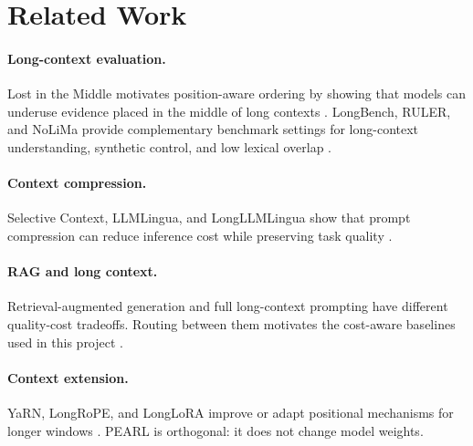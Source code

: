 \section{Related Work}

\paragraph{Long-context evaluation.}
Lost in the Middle motivates position-aware ordering by showing that models can
underuse evidence placed in the middle of long contexts \cite{liu2023lost}.
LongBench, RULER, and NoLiMa provide complementary benchmark settings for
long-context understanding, synthetic control, and low lexical overlap
\cite{bai2023longbench,hsieh2024ruler,modarressi2025nolima}.

\paragraph{Context compression.}
Selective Context, LLMLingua, and LongLLMLingua show that prompt compression can
reduce inference cost while preserving task quality
\cite{li2023selective,jiang2023llmlingua,jiang2024longllmlingua}.

\paragraph{RAG and long context.}
Retrieval-augmented generation and full long-context prompting have different
quality-cost tradeoffs. Routing between them motivates the cost-aware baselines
used in this project \cite{li2024raglongcontext}.

\paragraph{Context extension.}
YaRN, LongRoPE, and LongLoRA improve or adapt positional mechanisms for longer
windows \cite{peng2023yarn,ding2024longrope,chen2023longlora}. PEARL is
orthogonal: it does not change model weights.
